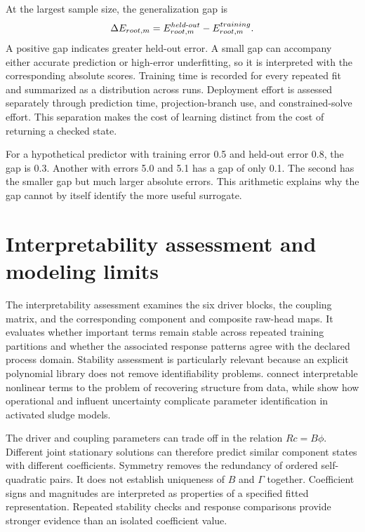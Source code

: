 At the largest sample size, the generalization gap is
\begin{equation}
\equationname{Held-out minus training root-error gap}
\label{eq:icsor_generalization_gap}
\Delta E_{root,m}=E_{root,m}^{held\text{-}out}-E_{root,m}^{training}.
\end{equation}
A positive gap indicates greater held-out error. A small gap can accompany either accurate prediction or high-error underfitting, so it is interpreted with the corresponding absolute scores. Training time is recorded for every repeated fit and summarized as a distribution across runs. Deployment effort is assessed separately through prediction time, projection-branch use, and constrained-solve effort. This separation makes the cost of learning distinct from the cost of returning a checked state.

For a hypothetical predictor with training error 0.5 and held-out error 0.8, the gap is 0.3. Another with errors 5.0 and 5.1 has a gap of only 0.1. The second has the smaller gap but much larger absolute errors. This arithmetic explains why the gap cannot by itself identify the more useful surrogate.

\section{Interpretability assessment and modeling limits}

The interpretability assessment examines the six driver blocks, the coupling matrix, and the corresponding component and composite raw-head maps. It evaluates whether important terms remain stable across repeated training partitions and whether the associated response patterns agree with the declared process domain. Stability assessment is particularly relevant because an explicit polynomial library does not remove identifiability problems. \citet{Brunton2016} connect interpretable nonlinear terms to the problem of recovering structure from data, while \citet{Machado2014} show how operational and influent uncertainty complicate parameter identification in activated sludge models.

The driver and coupling parameters can trade off in the relation \(Rc=B\phi\). Different joint stationary solutions can therefore predict similar component states with different coefficients. Symmetry removes the redundancy of ordered self-quadratic pairs. It does not establish uniqueness of \(B\) and \(\Gamma\) together. Coefficient signs and magnitudes are interpreted as properties of a specified fitted representation. Repeated stability checks and response comparisons provide stronger evidence than an isolated coefficient value.

